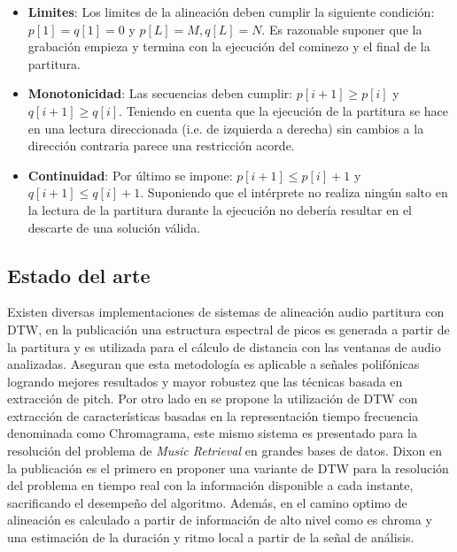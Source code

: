 \documentclass
  [ams,pdfout]%
	{aeslac}
\begin{document}
\begin{itemize}
\item \textbf{Limites}: Los limites de la alineación deben cumplir la siguiente condición: $p[1] = q [1] = 0$ y $p[L] = M, q[L] = N$. Es razonable suponer que la grabación empieza y termina con la ejecución del cominezo y el final de la partitura.
\item \textbf{Monotonicidad}: Las secuencias deben cumplir: $p[i+1] \geq p[i]$ y $q[i+1] \geq q[i]$. Teniendo en cuenta que la ejecución de la partitura se hace en una lectura direccionada (i.e. de izquierda a derecha) sin cambios a la dirección contraria parece una restricción acorde. 
\item \textbf{Continuidad}: Por último se impone: $p[i+1] \leq p[i] + 1$ y $q[i+1] \leq q[i] + 1$.  Suponiendo que el intérprete no realiza ningún salto en la lectura de la partitura durante la ejecución no debería resultar en el descarte de una solución válida. 
\end{itemize}


\subsection{Estado del arte}

Existen diversas implementaciones de sistemas de alineación audio partitura con DTW, en la publicación \cite{orio2001alignment} una estructura espectral de picos es generada a partir de la partitura y es utilizada para el cálculo de distancia con las ventanas de audio analizadas. Aseguran que esta metodología es aplicable a señales polifónicas logrando mejores resultados y mayor robustez que las técnicas basada en extracción de pitch. Por otro lado en \cite{dannenberg2006music} se propone la utilización de DTW con extracción de características basadas en la representación tiempo frecuencia denominada como Chromagrama, este mismo sistema es presentado para la resolución del problema de \textit{Music Retrieval} en grandes bases de datos. Dixon en la publicación \cite{dixon2005live} es el primero en proponer una variante de DTW para la resolución del problema en tiempo real con la información disponible a cada instante, sacrificando el desempeño del algoritmo. Además, en \cite{gagnon2007high} el camino optimo de alineación es calculado a partir de información de alto nivel como es chroma y una estimación de la duración y ritmo local a partir de la señal de análisis. 
\end{document}
